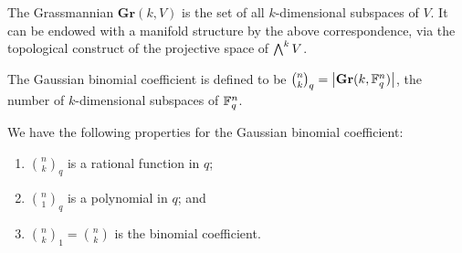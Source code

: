 \begin{remark}
    The Grassmannian \(\textbf{Gr}(k,V)\) is the set of all \(k\)-dimensional subspaces of \(V\).
    It can be endowed with a manifold structure by the above correspondence,
    via the topological construct of the projective space of \(\operatorname{{\bigwedge}}^k V\).
\end{remark}
\begin{definition}
    The Gaussian binomial coefficient is defined to be
    \(\binom{n}{k}_q = \abs{\textbf{Gr}(k,\mathbb{F}_q^n)}\),
    the number of \(k\)-dimensional subspaces of \(\mathbb{F}_q^n\).
\end{definition}
\begin{proposition}
    We have the following properties for the Gaussian binomial coefficient:
    \begin{enumerate}[label={(\alph*)}, itemsep=0mm]
        \item \(\binom{n}{k}_q\) is a rational function in \(q\);
        \item \(\binom{n}{1}_q\) is a polynomial in \(q\); and
        \item \(\binom{n}{k}_1 = \binom{n}{k}\) is the binomial coefficient.
    \end{enumerate}
\end{proposition}

